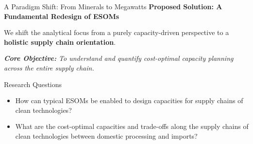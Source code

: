 \documentclass[10pt]{beamer}
\begin{document}
\begin{frame}{A Paradigm Shift: From Minerals to Megawatts}
    \textcolor{metublue}{\textbf{Proposed Solution: A Fundamental Redesign of ESOMs}}
    \vspace{0.5cm}
    
    We shift the analytical focus from a purely capacity-driven perspective to a \textcolor{metublue}{\textbf{holistic supply chain orientation}}.
    
    
    \vspace{0.5cm}
    \textit{\textcolor{metublue}{\textbf{Core Objective:}} To understand and quantify cost-optimal capacity planning across the entire supply chain.}%
\end{frame}

\begin{frame}{Research Questions}
    \begin{itemize}
        \item How can typical ESOMs be enabled to design capacities for supply chains of clean technologies?
        
        \vspace{0.5cm}
        
        \item What are the cost-optimal capacities and trade-offs along the supply chains of clean technologies between domestic processing and imports?
 
    \end{itemize}
\end{frame}
\end{document}
